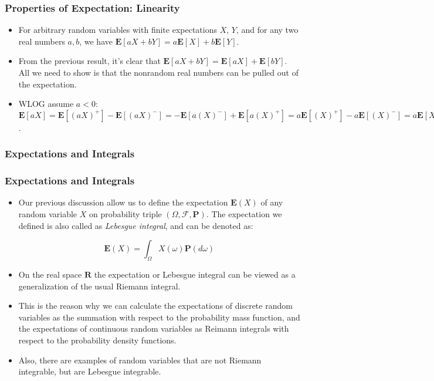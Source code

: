 \documentclass[handout]{beamer}
\newcommand{\BP}{\mathbf{P}}
\newcommand{\BE}{\mathbf{E}}
\begin{document}
\frame
{
  \frametitle{Properties of Expectation: Linearity}

   \begin{itemize}

  \item<1-> [] For arbitrary random variables with finite expectations $X$, $Y$, and for any two real numbers $a,b$, we have $\BE[aX + bY] = a\BE[X] + b\BE[Y]$.
  
  \item<2-> [] From the previous result, it's clear that $\BE[aX+bY] = \BE[aX] + \BE[bY]$. All we need to show is that the nonrandom real numbers can be pulled out of the expectation.
  
\item<3-> [] WLOG assume $a < 0$: $\BE[aX] = \BE[(aX)^+] - \BE[(aX)^-] =  -\BE[a(X)^-] + \BE[a(X)^+] = a\BE[(X)^+]  -a\BE[(X)^-]  = a\BE[X]$. 


\end{itemize}
}




\subsubsection{Expectations and Integrals }

\frame
{
  \frametitle{Expectations and Integrals}

   \begin{itemize}

   \item<1-> Our previous discussion allow us to define the expectation $\BE(X)$ of any random variable $X$ on probability triple $(\Omega, \mathcal{F}, \BP)$.  The expectation we defined is also called as \textit{Lebesgue integral}, and can be denoted as:
   
   $$\BE(X)=\int_{\Omega} X(\omega) \BP(d \omega) $$
   
     
   \item<2-> On the real space $\mathbf{R}$ the expectation or Lebesgue integral can be viewed as a generalization of the usual Riemann integral. 
   
   \item<3-> This is the reason why we can calculate the expectations of discrete random variables as the summation with respect to the probability mass function, and the expectations of continuous random variables as Reimann integrals with respect to the probability density functions.  
   
   \item<4-> Also, there are examples of random variables that are not Riemann integrable, but are Lebesgue integrable.

\end{itemize}
}
\end{document}
